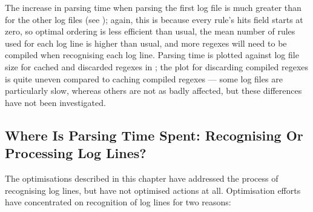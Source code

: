 The increase in parsing time when parsing the first log file is much
greater than for the other log files (see ); again, this is
because every rule's hits field starts at zero, so optimal ordering is less
efficient than usual, the mean number of rules used for each log line is
higher than usual, and more regexes will need to be compiled when
recognising each log line.  Parsing time is plotted against log file size
for cached and discarded regexes in ; the plot for
discarding compiled regexes is quite uneven compared to caching compiled
regexes --- some log files are particularly slow, whereas others are not as
badly affected, but these differences have not been investigated.




\FloatBarrier{}

\subsection{Where Is Parsing Time Spent: Recognising Or Processing Log
Lines?}

\label{recognising vs processing}

The optimisations described in this chapter have addressed the process of
recognising log lines, but have not optimised actions at all.  Optimisation
efforts have concentrated on recognition of log lines for two reasons:

